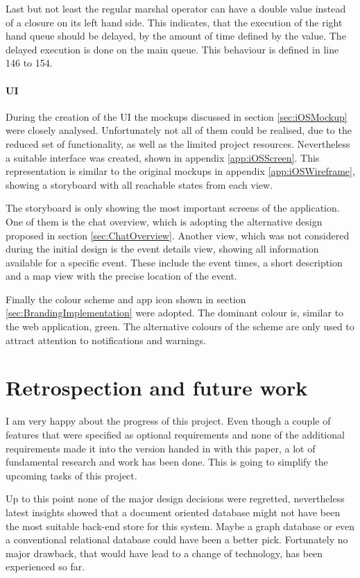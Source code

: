 Last but not least the regular marshal operator can have a double value instead of a closure on its left hand side. This indicates, that the execution of the right hand queue should be delayed, by the amount of time defined by the value. The delayed execution is done on the main queue. This behaviour is defined in line 146 to 154.

\subsubsection{UI}

During the creation of the \gls{UI} the mockups discussed in section \vref{sec:iOSMockup} were closely analysed. Unfortunately not all of them could be realised, due to the reduced set of functionality, as well as the limited project resources. Nevertheless a suitable interface was created, shown in appendix \vref{app:iOSScreen}. This representation is similar to the original mockups in appendix \vref{app:iOSWireframe}, showing a storyboard with all reachable states from each view. 

The storyboard is only showing the most important screens of the application. One of them is the chat overview, which is adopting the alternative design proposed in section \vref{sec:ChatOverview}. Another view, which was not considered during the initial design is the event details view, showing all information available for a specific event. These include the event times, a short description and a map view with the precise location of the event.

Finally the colour scheme and app icon shown in section \vref{sec:BrandingImplementation} were adopted. The dominant colour is, similar to the web application, green. The alternative colours of the scheme are only used to attract attention to notifications and warnings. 

\chapter{Retrospection and future work}
\label{chapter:OngoingWork}

I am very happy about the progress of this project. Even though a couple of features that were specified as optional requirements and none of the additional requirements made it into the version handed in with this paper, a lot of fundamental research and work has been done. This is going to simplify the upcoming tasks of this project. 

Up to this point none of the major design decisions were regretted, nevertheless latest insights showed that a document oriented database might not have been the most suitable back-end store for this system. Maybe a graph database or even a conventional relational database could have been a better pick. Fortunately no major drawback, that would have lead to a change of technology, has been experienced so far.

